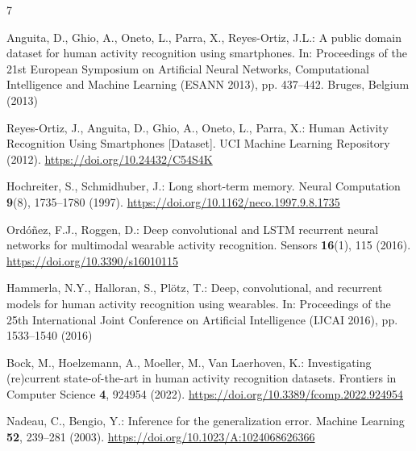 \documentclass[runningheads]{llncs}
\providecommand{\doi}[1]{\href{https://doi.org/#1}{https://doi.org/#1}}
\begin{document}
\begin{thebibliography}{7}
\setlength{\itemsep}{0pt}
\small

Anguita, D., Ghio, A., Oneto, L., Parra, X., Reyes-Ortiz, J.L.: A public domain
dataset for human activity recognition using smartphones. In: Proceedings of the
21st European Symposium on Artificial Neural Networks, Computational Intelligence
and Machine Learning (ESANN 2013), pp. 437--442. Bruges, Belgium (2013)

Reyes-Ortiz, J., Anguita, D., Ghio, A., Oneto, L., Parra, X.: Human Activity
Recognition Using Smartphones [Dataset]. UCI Machine Learning Repository (2012).
\doi{10.24432/C54S4K}

Hochreiter, S., Schmidhuber, J.: Long short-term memory. Neural Computation
\textbf{9}(8), 1735--1780 (1997). \doi{10.1162/neco.1997.9.8.1735}

Ordóñez, F.J., Roggen, D.: Deep convolutional and LSTM recurrent neural networks
for multimodal wearable activity recognition. Sensors \textbf{16}(1), 115 (2016).
\doi{10.3390/s16010115}

Hammerla, N.Y., Halloran, S., Plötz, T.: Deep, convolutional, and recurrent
models for human activity recognition using wearables. In: Proceedings of the
25th International Joint Conference on Artificial Intelligence (IJCAI 2016),
pp. 1533--1540 (2016)

Bock, M., Hoelzemann, A., Moeller, M., Van Laerhoven, K.: Investigating
(re)current state-of-the-art in human activity recognition datasets. Frontiers
in Computer Science \textbf{4}, 924954 (2022). \doi{10.3389/fcomp.2022.924954}

Nadeau, C., Bengio, Y.: Inference for the generalization error. Machine Learning
\textbf{52}, 239--281 (2003). \doi{10.1023/A:1024068626366}

\end{thebibliography}
\end{document}
